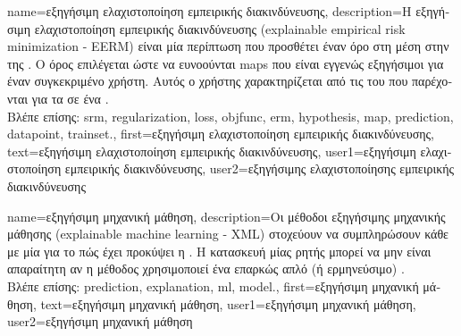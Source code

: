 {name={\foreignlanguage{greek}{εξηγήσιμη ελαχιστοποίηση εμπειρικής διακινδύνευσης}}, 
	description={\foreignlanguage{greek}{Η εξηγήσιμη ελαχιστοποίηση εμπειρικής διακινδύνευσης} 
		(explainable empirical risk minimization - EERM) 
		\foreignlanguage{greek}{είναι μία περίπτωση}  \foreignlanguage{greek}{που προσθέτει έναν όρο} 
		 \foreignlanguage{greek}{στη μέση}  \foreignlanguage{greek}{στην}  
		\foreignlanguage{greek}{της} . 
		\foreignlanguage{greek}{Ο όρος}  \foreignlanguage{greek}{επιλέγεται ώστε να ευνοούνται} \gls{map}s 
		 \foreignlanguage{greek}{που είναι εγγενώς εξηγήσιμοι για έναν συγκεκριμένο χρήστη. Αυτός ο 
		χρήστης χαρακτηρίζεται από τις}  \foreignlanguage{greek}{του που παρέχονται για τα}  
		 \foreignlanguage{greek}{σε ένα}  \cite{Zhang:2024aa}.\\
		\foreignlanguage{greek}{Βλέπε επίσης:} \gls{srm}, \gls{regularization}, \gls{loss}, \gls{objfunc}, \gls{erm}, \gls{hypothesis}, 
		\gls{map}, \gls{prediction}, \gls{datapoint}, \gls{trainset}.},
	first={\foreignlanguage{greek}{εξηγήσιμη ελαχιστοποίηση εμπειρικής διακινδύνευσης}}, 
	text={\foreignlanguage{greek}{εξηγήσιμη ελαχιστοποίηση εμπειρικής διακινδύνευσης}},
	user1={\foreignlanguage{greek}{εξηγήσιμη ελαχιστοποίηση εμπειρικής διακινδύνευσης}}, %
  	user2={\foreignlanguage{greek}{εξηγήσιμης ελαχιστοποίησης εμπειρικής διακινδύνευσης}} %
}

{name={\foreignlanguage{greek}{εξηγήσιμη μηχανική μάθηση}}, 
	description={\foreignlanguage{greek}{Οι μέθοδοι εξηγήσιμης μηχανικής 
		μάθησης} (explainable machine learning - XML)
		\foreignlanguage{greek}{στοχεύουν να συμπληρώσουν κάθε}  \foreignlanguage{greek}{με μία} 
		 \foreignlanguage{greek}{για το πώς έχει προκύψει η} . 
		\foreignlanguage{greek}{Η κατασκευή μίας ρητής}  \foreignlanguage{greek}{μπορεί να 
		μην είναι απαραίτητη αν η μέθοδος}  \foreignlanguage{greek}{χρησιμοποιεί ένα επαρκώς απλό 
		(ή ερμηνεύ\-σιμο})  \cite{rudin2019stop}.\\
		\foreignlanguage{greek}{Βλέπε επίσης:} \gls{prediction}, \gls{explanation}, \gls{ml}, \gls{model}.},
	first={\foreignlanguage{greek}{εξηγήσιμη μηχανική μάθηση}},
	text={\foreignlanguage{greek}{εξηγήσιμη μηχανική μάθηση}},
	user1={\foreignlanguage{greek}{εξηγήσιμη μηχανική μάθηση}}, %
  	user2={\foreignlanguage{greek}{εξηγήσιμη μηχανική μάθηση}} %
}

